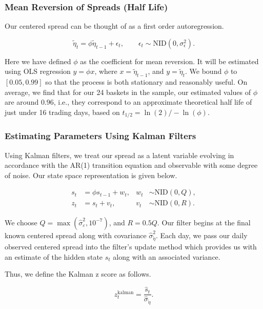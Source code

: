 \documentclass[12pt]{article}
\begin{document}
\subsubsection{Mean Reversion of Spreads (Half Life)}

Our centered spread can be thought of as a first order autoregression.

\begin{equation}
\tilde{\eta}_t = \phi \tilde{\eta}_{t-1} + \epsilon_t,
\qquad \epsilon_t \sim \text{NID}(0, \sigma^2_\epsilon).
\end{equation}

Here we have defined $\phi$ as the coefficient for mean reversion. It will be estimated using OLS regression $y = \phi x$, where $x = \tilde{\eta}_{t-1}$, and $y = \tilde{\eta}_t$. We bound $\phi$ to $[0.05, 0.99]$ so that the process is both stationary and reasonably useful. On average, we find that for our 24 baskets in the sample, our estimated values of $\phi$ are around $0.96$, i.e., they correspond to an approximate theoretical half life of just under 16 trading days, based on $t_{1/2} = \ln(2) / -\ln(\phi)$.

\subsubsection{Estimating Parameters Using Kalman Filters}

Using Kalman filters, we treat our spread as a latent variable evolving in accordance with the AR(1) transition equation and observable with some degree of noise. Our state space representation is given below.

\begin{align}
s_t &= \phi s_{t-1} + w_t, 
& w_t &\sim \text{NID}(0,Q), \\
z_t &= s_t + v_t, 
& v_t &\sim \text{NID}(0,R).
\end{align}

We choose $Q = \max(\hat{\sigma}^2_\varepsilon, 10^{-7})$, and $R = 0.5Q$. Our filter begins at the final known centered spread along with covariance $\hat{\sigma}^2_{\tilde{\eta}}$. Each day, we pass our daily observed centered spread into the filter's update method which provides us with an estimate of the hidden state $s_t$ along with an associated variance.

Thus, we define the Kalman z score as follows.

\begin{equation}
z_t^{\text{kalman}} = \frac{\hat{s}_t}{\hat{\sigma}_{\tilde{\eta}}}.
\end{equation}
\end{document}
